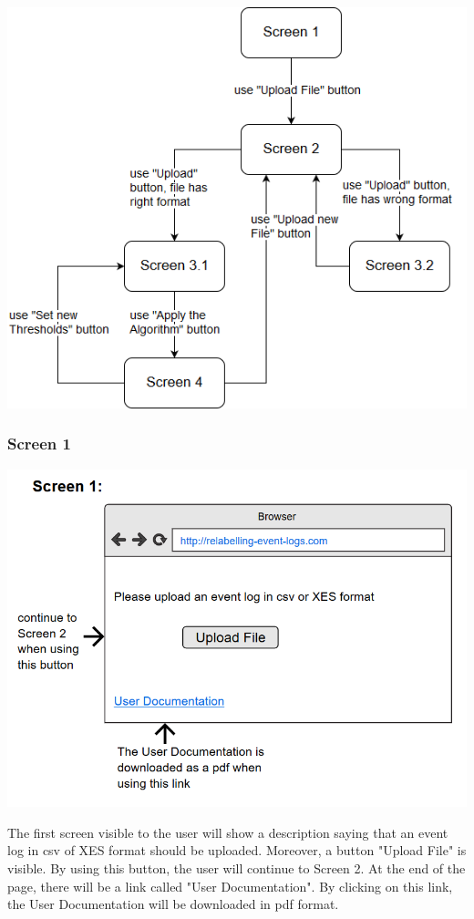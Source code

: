 \documentclass[notitlepage]{article}
\begin{document}
\begin{flushleft}
\includegraphics[scale=0.7]{ScreenFlow.png}

\subsubsection{Screen 1}

\includegraphics[scale=0.8]{InterfaceMockup1.png}


The first screen visible to the user will show a description saying that an event log in csv of XES format should be uploaded. Moreover, a button "Upload File" is visible. By using this button, the user will continue to Screen 2. At the end of the page, there will be a link called "User Documentation". By clicking on this link, the User Documentation will be downloaded in pdf format.

\end{flushleft}
\end{document}
